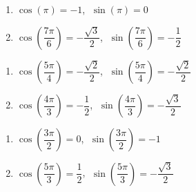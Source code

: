 \begin{multicols}{2}

\begin{enumerate}

\setcounter{enumi}{\value{HW}}

\item $\cos(\pi) = -1$, $\; \sin(\pi) = 0$ 

\item $\cos\left(\dfrac{7\pi}{6}\right) = -\dfrac{\sqrt{3}}{2}$, $\; \sin\left(\dfrac{7\pi}{6}\right) = -\dfrac{1}{2}$

\setcounter{HW}{\value{enumi}}

\end{enumerate}

\end{multicols}

\begin{multicols}{2}

\begin{enumerate}

\setcounter{enumi}{\value{HW}}

\item $\cos \left(\dfrac{5\pi}{4} \right) = -\dfrac{\sqrt{2}}{2}$, $\; \sin \left(\dfrac{5\pi}{4} \right) = -\dfrac{\sqrt{2}}{2}$

\item $\cos\left(\dfrac{4\pi}{3}\right) = -\dfrac{1}{2}$, $\; \sin \left(\dfrac{4\pi}{3}\right) = -\dfrac{\sqrt{3}}{2}$

\setcounter{HW}{\value{enumi}}

\end{enumerate}

\end{multicols}

\begin{multicols}{2}

\begin{enumerate}

\setcounter{enumi}{\value{HW}}

\item $\cos \left(\dfrac{3\pi}{2}\right) = 0$, $\; \sin \left(\dfrac{3\pi}{2}\right) = -1$

\item $\cos\left(\dfrac{5\pi}{3}\right) = \dfrac{1}{2}$, $\; \sin \left(\dfrac{5\pi}{3}\right) = -\dfrac{\sqrt{3}}{2}$

\setcounter{HW}{\value{enumi}}

\end{enumerate}

\end{multicols}

